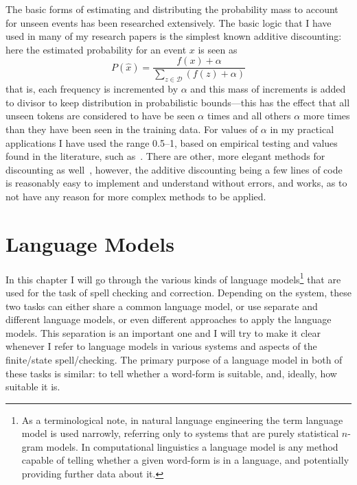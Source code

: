 \documentclass[officiallayout,final]{unihelcompling}
\begin{document}
The basic forms of estimating and distributing the probability mass to account
for unseen events has been researched extensively. The basic logic that I have
used in many of my research papers is the simplest known additive discounting:
here the estimated probability for an event $x$ is seen as \begin{equation}
P(\hat{x}) = \frac{f(x) + \alpha}{\sum_{z \in \mathcal{D}}(f(z) + \alpha)}
\end{equation} that is, each frequency is incremented by $\alpha$ and this mass
of increments is added to divisor to keep distribution in probabilistic
bounds---this has the effect that all unseen tokens are considered to have be
seen $\alpha$ times and all others $\alpha$ more times than they have been seen
in the training data.  For values of $\alpha$ in my practical applications I
have used the range 0.5--1, based on empirical testing and values found in the
literature, such as~\citet{manning1999foundations}. There are other, more
elegant methods for discounting as well~\citep{chen1999empirical}, however,
the additive discounting being a few lines of code is reasonably easy to
implement and understand without errors, and works, as to not have any reason
for more complex methods to be applied.


\chapter{Language Models}
\label{chap:language-models}

In this chapter I will go through the various kinds of
\glspl{language model}\footnote{As a terminological note, in \gls{natural language
    engineering} the term language model is used narrowly, referring only
    to systems that are purely statistical \(n\)-gram models. In
    computational linguistics a language model is any method capable of
    telling whether a given word-form is in a language, and potentially
    providing further data about it.} that are
used for the task of spell checking and correction.  Depending on the system,
these two tasks can either share a common language model, or use separate and
different language models, or even different approaches to apply the language
models. This separation is an important one and I will try to make it clear
whenever I refer to language models in various systems and aspects of the
finite\-/state spell\-/checking.  The primary purpose of a language model in
both of these tasks is similar: to tell whether a word-form is suitable, and,
ideally, how suitable it is.
\end{document}
